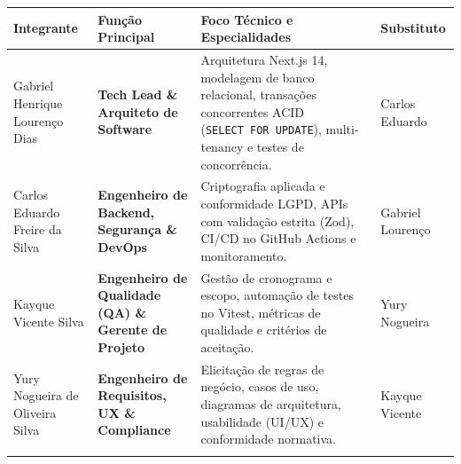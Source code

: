 {\footnotesize
\begin{tabularx}{\textwidth}{>{\fontSemiBold\color{BrandNavy}\hsize\sloppy\arraybackslash}X >{\hsize\sloppy\arraybackslash}X >{\hsize\sloppy\arraybackslash}X L{2.74cm}}
\toprule
{}
\textbf{Integrante} & \textbf{Função Principal} & \textbf{Foco Técnico e Especialidades} & \textbf{Substituto} \\
\midrule
{}
Gabriel Henrique Lourenço Dias & \textbf{Tech Lead \& Arquiteto de Software} & Arquitetura Next.js 14, modelagem de banco relacional, transações concorrentes ACID (\texttt{SELECT\ FOR\ UPDATE}), multi-tenancy e testes de concorrência. & Carlos Eduardo \\
\midrule
Carlos Eduardo Freire da Silva & \textbf{Engenheiro de Backend, Segurança \& DevOps} & Criptografia aplicada e conformidade LGPD, APIs com validação estrita (Zod), CI/CD no GitHub Actions e monitoramento. & Gabriel Lourenço \\
\midrule
Kayque Vicente Silva & \textbf{Engenheiro de Qualidade (QA) \& Gerente de Projeto} & Gestão de cronograma e escopo, automação de testes no Vitest, métricas de qualidade e critérios de aceitação. & Yury Nogueira \\
\midrule
Yury Nogueira de Oliveira Silva & \textbf{Engenheiro de Requisitos, UX \& Compliance} & Elicitação de regras de negócio, casos de uso, diagramas de arquitetura, usabilidade (UI/UX) e conformidade normativa. & Kayque Vicente \\
\bottomrule
\end{tabularx}%
}
